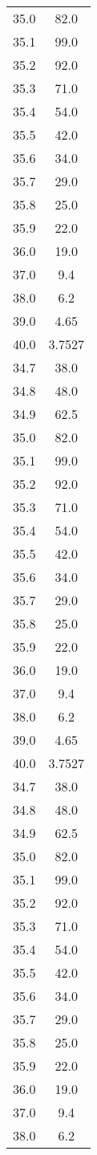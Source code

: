 \begin{table}
\begin{tabular}{S[]S[]}
35.0 & 82.0\\
35.1 & 99.0\\
35.2 & 92.0\\
35.3 & 71.0\\
35.4 & 54.0\\
35.5 & 42.0\\
35.6 & 34.0\\
35.7 & 29.0\\
35.8 & 25.0\\
35.9 & 22.0\\
36.0 & 19.0\\
37.0 & 9.4\\
38.0 & 6.2\\
39.0 & 4.65\\
40.0 & 3.7527\\
34.7 & 38.0\\
34.8 & 48.0\\
34.9 & 62.5\\
35.0 & 82.0\\
35.1 & 99.0\\
35.2 & 92.0\\
35.3 & 71.0\\
35.4 & 54.0\\
35.5 & 42.0\\
35.6 & 34.0\\
35.7 & 29.0\\
35.8 & 25.0\\
35.9 & 22.0\\
36.0 & 19.0\\
37.0 & 9.4\\
38.0 & 6.2\\
39.0 & 4.65\\
40.0 & 3.7527\\
34.7 & 38.0\\
34.8 & 48.0\\
34.9 & 62.5\\
35.0 & 82.0\\
35.1 & 99.0\\
35.2 & 92.0\\
35.3 & 71.0\\
35.4 & 54.0\\
35.5 & 42.0\\
35.6 & 34.0\\
35.7 & 29.0\\
35.8 & 25.0\\
35.9 & 22.0\\
36.0 & 19.0\\
37.0 & 9.4\\
38.0 & 6.2\\

\end{tabular}
\end{table}
